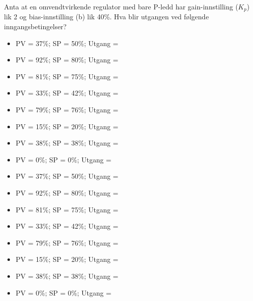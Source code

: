 

Anta at en omvendtvirkende regulator med bare P-ledd har gain-innstilling ($K_p$) lik 2 og bias-innstilling (b) lik 40\%. Hva blir utgangen ved følgende inngangsbetingelser?

\begin{itemize}
\item{}PV = 37\%; SP = 50\%; Utgang = \underbar{\hskip 50pt}
\vskip 5pt
\item{}PV = 92\%; SP = 80\%; Utgang = \underbar{\hskip 50pt}
\vskip 5pt
\item{}PV = 81\%; SP = 75\%; Utgang = \underbar{\hskip 50pt}
\vskip 5pt
\item{}PV = 33\%; SP = 42\%; Utgang = \underbar{\hskip 50pt}
\vskip 5pt
\item{}PV = 79\%; SP = 76\%; Utgang = \underbar{\hskip 50pt}
\vskip 5pt
\item{}PV = 15\%; SP = 20\%; Utgang = \underbar{\hskip 50pt}
\vskip 5pt
\item{}PV = 38\%; SP = 38\%; Utgang = \underbar{\hskip 50pt}
\vskip 5pt
\item{}PV = 0\%; SP = 0\%; Utgang = \underbar{\hskip 50pt}
\end{itemize} 







\begin{itemize}
\item{}PV = 37\%; SP = 50\%; Utgang = 
\vskip 5pt
\item{}PV = 92\%; SP = 80\%; Utgang = 
\vskip 5pt
\item{}PV = 81\%; SP = 75\%; Utgang = 
\vskip 5pt
\item{}PV = 33\%; SP = 42\%; Utgang = 
\vskip 5pt
\item{}PV = 79\%; SP = 76\%; Utgang = 
\vskip 5pt
\item{}PV = 15\%; SP = 20\%; Utgang = 
\vskip 5pt
\item{}PV = 38\%; SP = 38\%; Utgang = 
\vskip 5pt
\item{}PV = 0\%; SP = 0\%; Utgang = 
\end{itemize} 











